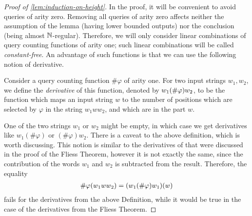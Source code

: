 \begin{proof}[Proof of \cref{lem:induction-on-height}]
In the proof, it will be convenient to avoid queries of arity zero. Removing all queries of arity zero affects neither the assumption of the lemma (having lower bounded outputs)  nor the conclusion (being almost ${\mathbb N}$-regular). Therefore, we will only consider linear combinations of query counting functions of arity one; such linear combinations will be called \emph{constant-free}.
An advantage of such functions is that we can use the following notion of derivative. 



\begin{definition}[Derivative]
    Consider a query counting function $\#\varphi$ of arity one. For two input strings $w_1, w_2$, we define the \emph{derivative} of this function, denoted by $w_1 (\#\varphi) w_2$, to be the function which maps an input string $w$ to the number of positions which are selected by $\varphi$ in the string $w_1 w w_2$, and which are in the part $w$.
\end{definition}




One of the two strings $w_1$ or $w_2$ might be empty, in which case we get derivatives like $w_1 (\#\varphi)$ or $(\# \varphi)w_2$. 
There is a caveat to the above definition, which is worth discussing. 
This notion is similar to the derivatives of that were discussed in the proof of the Fliess Theorem, however it is not exactly the same, since the contribution of the words $w_1$ and $w_2$ is subtracted from the result. Therefore, the equality
\begin{align*}
\#\varphi(w_1 w w_2) = 
(w_1 (\#\varphi) w_1) (w)
\end{align*}
fails for the derivatives from the above Definition, while it  would be true in the case of the derivatives from the Fliess Theorem. 




\end{proof}
